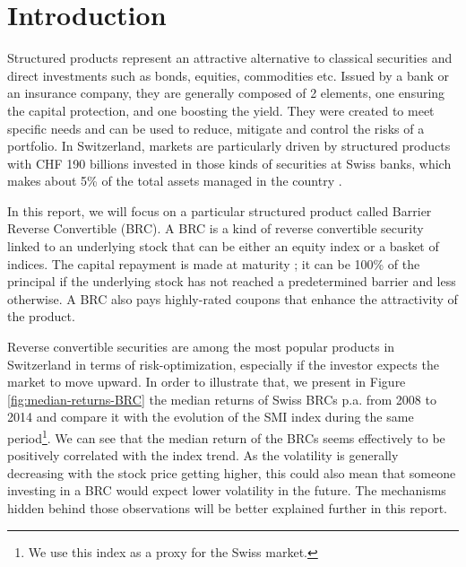\documentclass[a4paper,11pt,english]{book}
\begin{document}
\pagestyle{empty}
\tableofcontents
\listoffigures
\listoftables

\mainmatter
\chapter*{Introduction}
\vspace*{-2cm}

Structured products represent an attractive alternative to classical securities and direct investments such as bonds, equities, commodities etc. Issued by a bank or an insurance company, they are generally composed of 2 elements, one ensuring the capital protection, and one boosting the yield. They were created to meet specific needs and can be used to reduce, mitigate and control the risks of a portfolio. In Switzerland, markets are particularly driven by structured products with CHF 190 billions invested in those kinds of securities at Swiss banks, which makes about 5\% of the total assets managed in the country \cite{SSPA}.

In this report, we will focus on a particular structured product called Barrier Reverse Convertible (BRC). A BRC is a kind of reverse convertible security linked to an underlying stock that can be either an equity index or a basket of indices. The capital repayment is made at maturity ; it can be 100\% of the principal if the underlying stock has not reached a predetermined barrier and less otherwise. A BRC also pays highly-rated coupons that enhance the attractivity of the product.

Reverse convertible securities are among the most popular products in Switzerland in terms of risk-optimization, especially if the investor expects the market to move upward. In order to illustrate that, we present in Figure \ref{fig:median-returns-BRC} the median returns of Swiss BRCs p.a. from 2008 to 2014 \cite{SSPA-study} and compare it with the evolution of the SMI index during the same period\footnote{We use this index as a proxy for the Swiss market.}. We can see that the median return of the BRCs seems effectively to be positively correlated with the index trend. As the volatility is generally decreasing with the stock price getting higher, this could also mean that someone investing in a BRC would expect lower volatility in the future. The mechanisms hidden behind those observations will be better explained further in this report.
\end{document}
